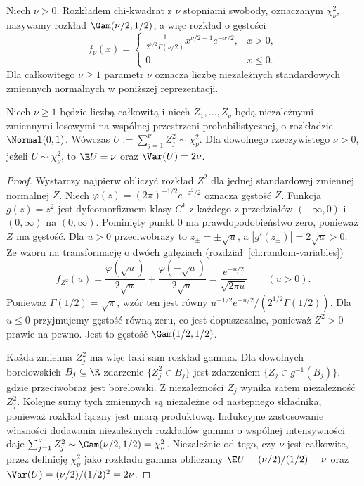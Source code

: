 \begin{definicja}
Niech $\nu>0$. Rozkładem chi-kwadrat z $\nu$ stopniami swobody,
oznaczanym $\chi^2_\nu$, nazywamy rozkład
$\Gam(\nu/2,1/2)$, a więc rozkład o gęstości
\begin{equation}\label{eq:chisq}
f_\nu(x)=
\begin{cases}
\displaystyle\frac{1}{2^{\nu/2}\Gamma(\nu/2)}
 x^{\nu/2-1}e^{-x/2},&x>0,\\
0,&x\leq0.
\end{cases}
\end{equation}
Dla całkowitego $\nu\geq1$ parametr $\nu$ oznacza liczbę
niezależnych standardowych zmiennych normalnych
w poniższej reprezentacji.
\end{definicja}

\begin{twierdzenie}
Niech $\nu\geq1$ będzie liczbą całkowitą i niech
$Z_1,\ldots,Z_\nu$ będą niezależnymi zmiennymi losowymi
na wspólnej przestrzeni probabilistycznej, o rozkładzie
$\Normal(0,1)$. Wówczas
$U:=\sum_{j=1}^\nu Z_j^2\sim\chi^2_\nu$.
Dla dowolnego rzeczywistego $\nu>0$, jeżeli $U\sim\chi^2_\nu$,
to $\E U=\nu$ oraz $\Var(U)=2\nu$.
\end{twierdzenie}
\begin{proof}
Wystarczy najpierw obliczyć rozkład $Z^2$ dla jednej
standardowej zmiennej normalnej $Z$.
Niech $\varphi(z)=(2\pi)^{-1/2}e^{-z^2/2}$ oznacza
gęstość $Z$. Funkcja $g(z)=z^2$ jest dyfeomorfizmem
klasy $C^1$ z każdego z przedziałów $(-\infty,0)$
i $(0,\infty)$ na $(0,\infty)$.
Pominięty punkt $0$ ma prawdopodobieństwo zero,
ponieważ $Z$ ma gęstość. Dla $u>0$ przeciwobrazy to
$z_\pm=\pm\sqrt u$, a $|g'(z_\pm)|=2\sqrt u>0$.
Ze wzoru na transformację o dwóch gałęziach
(rozdział~\ref{ch:random-variables})
\[
f_{Z^2}(u)=\frac{\varphi(\sqrt u)}{2\sqrt u}
+\frac{\varphi(-\sqrt u)}{2\sqrt u}
=\frac{e^{-u/2}}{\sqrt{2\pi u}}
\qquad(u>0).
\]
Ponieważ $\Gamma(1/2)=\sqrt\pi$, wzór ten jest równy
$u^{-1/2}e^{-u/2}/(2^{1/2}\Gamma(1/2))$.
Dla $u\leq0$ przyjmujemy gęstość równą zeru,
co jest dopuszczalne, ponieważ $Z^2>0$ prawie na pewno.
Jest to gęstość $\Gam(1/2,1/2)$.

Każda zmienna $Z_j^2$ ma więc taki sam rozkład gamma.
Dla dowolnych borelowskich $B_j\subseteq\R$
zdarzenie $\{Z_j^2\in B_j\}$ jest zdarzeniem
$\{Z_j\in g^{-1}(B_j)\}$, gdzie przeciwobraz jest
borelowski. Z niezależności $Z_j$ wynika zatem
niezależność $Z_j^2$. Kolejne sumy tych zmiennych
są niezależne od następnego składnika, ponieważ
rozkład łączny jest miarą produktową.
Indukcyjne zastosowanie własności dodawania niezależnych
rozkładów gamma o wspólnej intensywności daje
$\sum_{j=1}^\nu Z_j^2\sim\Gam(\nu/2,1/2)=\chi^2_\nu$.
Niezależnie od tego, czy $\nu$ jest całkowite,
przez definicję $\chi^2_\nu$ jako rozkładu gamma
obliczamy $\E U=(\nu/2)/(1/2)=\nu$ oraz
$\Var(U)=(\nu/2)/(1/2)^2=2\nu$.
\end{proof}

